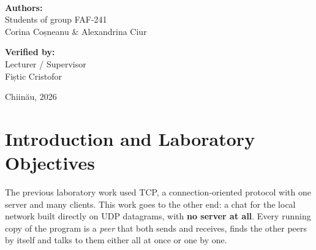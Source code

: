 \documentclass[11pt, a4paper]{article}
\begin{document}
\begin{titlepage}
    \vspace{2.2cm}  \\[5cm]

    \noindent
    \begin{minipage}[t]{0.48\textwidth}
        \raggedright \large
        \textbf{Authors:} \\[0.15cm]
        Students of group FAF-241 \\[0.15cm]
        Corina Coșneanu \& Alexandrina Ciur
    \end{minipage}%
    \hfill
    \begin{minipage}[t]{0.48\textwidth}
        \raggedleft \large
        \textbf{Verified by:} \\[0.15cm]
        Lecturer / Supervisor \\[0.15cm]
        Fiștic Cristofor
    \end{minipage}

    \vfill

    {\large Chiin\u{a}u, 2026 \par}
\end{titlepage}

\newpage
\tableofcontents
\newpage

\section{Introduction and Laboratory Objectives}
The previous laboratory work used TCP, a connection-oriented protocol with one server and many clients. This work goes to the other end: a chat for the local network built directly on UDP datagrams, with \textbf{no server at all}. Every running copy of the program is a \emph{peer} that both sends and receives, finds the other peers by itself and talks to them either all at once or one by one.
\end{document}
